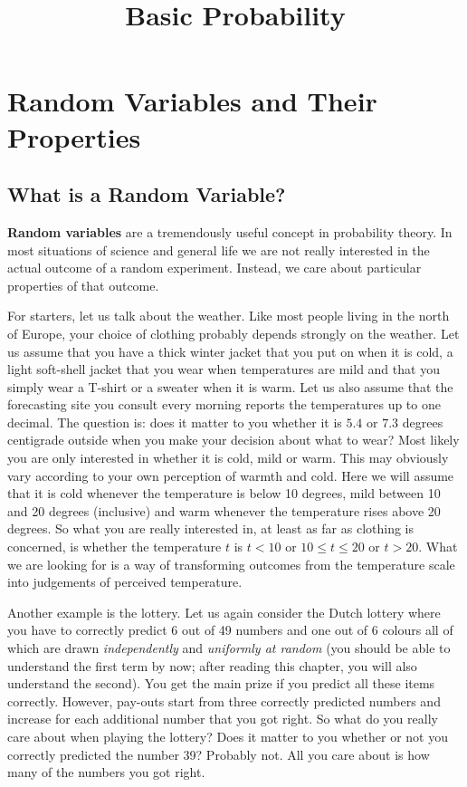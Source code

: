 \documentclass[a4paper,11pt,leqno]{report}
\title{Basic Probability}
\date{}
\begin{document}
\setcounter{chapter}{2}

\chapter{Random Variables and Their Properties}

\section{What is a Random Variable?}
\textbf{Random variables} are a tremendously useful concept in probability theory. In most situations of
science and general life we are not really interested in the actual outcome of a random experiment. Instead,
we care about particular properties of that outcome.

For starters, let us talk about the weather. 
Like most people living in the north of Europe, your choice of clothing
probably depends strongly on the weather. Let us assume that you have a thick winter jacket that you
put on when it is cold, a light soft-shell jacket that you wear when temperatures are mild and that you
simply wear a T-shirt or a sweater when it is warm. Let us also assume that the forecasting site you
consult every morning reports the temperatures up to one decimal. The question is: does it matter to you
whether it is $ 5.4 $ or $ 7.3 $ degrees centigrade outside when you make your decision about what to wear?
Most likely you are only interested in whether it is cold, mild or warm. This may obviously vary according
to your own perception of warmth and cold. Here we will assume that it is cold whenever the temperature
is below 10 degrees, mild between 10 and 20 degrees (inclusive) and warm whenever the temperature rises
above 20 degrees. So what you are really interested in, at least as far as clothing is concerned, is 
whether the temperature $ t $ is $ t < 10 $ or $ 10 \leq t \leq 20 $ or $ t > 20 $. What we are looking for
is a way of transforming outcomes from the temperature scale into judgements of perceived temperature.

Another example is the lottery. Let us again consider the Dutch lottery where you have to correctly 
predict 6 out of 49 numbers and one out of 6 colours all of which are drawn \textit{independently} 
and \textit{uniformly at random} (you should be able to understand the first term by now; after reading
this chapter, you will also understand the second). You get the main prize if you predict all these items
correctly. However, pay-outs start from three correctly predicted numbers and increase for each additional
number that you got right. So what do you really care about when playing the lottery? Does it matter to
you whether or not you correctly predicted the number 39? Probably not. All you care about is how many of
the numbers you got right.
\end{document}

